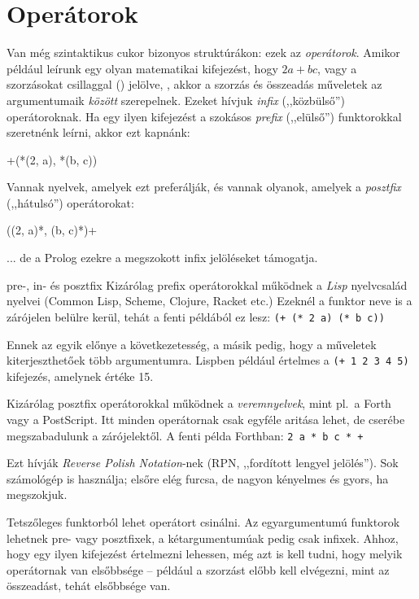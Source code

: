 \chapter{Operátorok}
Van még szintaktikus cukor bizonyos struktúrákon:
ezek az \emph{operátorok}. Amikor például leírunk
egy olyan matematikai kifejezést, hogy $2a+bc$, vagy
a szorzásokat csillaggal (\pr{*}) jelölve,
, akkor a szorzás és összeadás műveletek
az argumentumaik \emph{között} szerepelnek. Ezeket
hívjuk \emph{infix} (,,közbülső'') operátoroknak. Ha
egy ilyen kifejezést a szokásos \emph{prefix}
(,,elülső'') funktorokkal szeretnénk leírni, akkor
ezt kapnánk:
\begin{query}
+(*(2, a), *(b, c))
\end{query}
Vannak nyelvek, amelyek ezt preferálják, és vannak
olyanok, amelyek a \emph{posztfix} (,,hátulsó'')
operátorokat:
\begin{query}
((2, a)*, (b, c)*)+
\end{query}
... de a Prolog ezekre a megszokott infix
jelöléseket támogatja.

\begin{infobox*}{}{pre-, in- és posztfix}
Kizárólag prefix operátorokkal működnek a
\emph{Lisp} nyelvcsalád nyelvei (Common Lisp,
Scheme, Clojure, Racket etc.) Ezeknél a funktor neve
is a zárójelen belülre kerül, tehát a fenti példából
ez lesz: {\tt (+ (* 2 a) (* b c))}

Ennek az egyik előnye a következetesség, a másik
pedig, hogy a műveletek kiterjeszthetőek több
argumentumra. Lispben például értelmes a {\tt (+ 1 2
  3 4 5)} kifejezés, amelynek értéke 15.

Kizárólag posztfix operátorokkal működnek a
\emph{veremnyelvek}, mint pl.~a Forth vagy a
PostScript. Itt minden operátornak csak egyféle
aritása lehet, de cserébe megszabadulunk a
zárójelektől. A fenti példa Forthban: {\tt 2 a * b c
  * +} 

Ezt hívják \emph{Reverse Polish Notation}-nek (RPN,
,,fordított lengyel jelölés''). Sok számológép is
használja; elsőre elég furcsa, de nagyon kényelmes és gyors,
ha megszokjuk.
\end{infobox*}

Tetszőleges funktorból lehet operátort csinálni. Az
egyargumentumú funktorok lehetnek pre- vagy
posztfixek, a kétargumentumúak pedig csak
infixek. Ahhoz, hogy egy ilyen kifejezést értelmezni
lehessen, még azt is kell tudni, hogy melyik operátornak
van elsőbbsége -- például a szorzást előbb kell
elvégezni, mint az összeadást, tehát elsőbbsége van.

